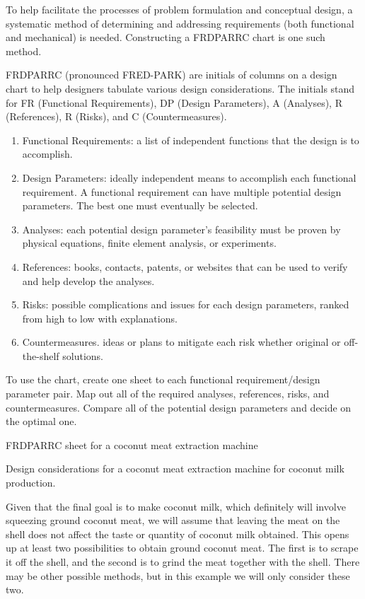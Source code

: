 \documentclass[a4paper,openany,12pt]{book}
\begin{document}
To help facilitate the processes of problem formulation and conceptual
design, a systematic method of determining and addressing requirements
(both functional and mechanical) is needed. Constructing a FRDPARRC
chart is one such method.

FRDPARRC (pronounced FRED-PARK) are initials of columns on a design
chart to help designers tabulate various design considerations. The
initials stand for FR (Functional Requirements), DP (Design Parameters),
A (Analyses), R (References), R (Risks), and C (Countermeasures).

\begin{enumerate}
\item Functional Requirements: a list of independent functions that the
design is to accomplish.

\item Design Parameters: ideally independent means to accomplish each
functional requirement. A functional requirement can have multiple
potential design parameters. The best one must eventually be
selected.

\item Analyses: each potential design parameter's feasibility must be
proven by physical equations, finite element analysis, or
experiments.

\item References: books, contacts, patents, or websites that can be used to
verify and help develop the analyses.

\item Risks: possible complications and issues for each design parameters,
ranked from high to low with explanations.

\item Countermeasures. ideas or plans to mitigate each risk whether
original or off-the-shelf solutions.
\end{enumerate}

To use the chart, create one sheet to each functional requirement/design
parameter pair. Map out all of the required analyses, references, risks,
and countermeasures. Compare all of the potential design parameters and
decide on the optimal one.

FRDPARRC sheet for a coconut meat extraction machine

Design considerations for a coconut meat extraction machine for coconut
milk production.

Given that the final goal is to make coconut milk, which definitely will
involve squeezing ground coconut meat, we will assume that leaving the
meat on the shell does not affect the taste or quantity of coconut milk
obtained. This opens up at least two possibilities to obtain ground
coconut meat. The first is to scrape it off the shell, and the second is
to grind the meat together with the shell. There may be other possible
methods, but in this example we will only consider these two.
\end{document}
